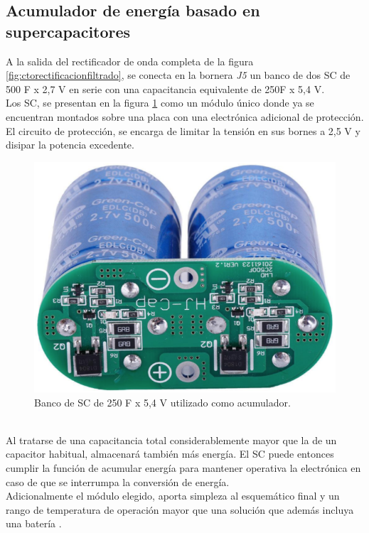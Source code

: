 \subsection{Acumulador de energía basado en supercapacitores}
A la salida del rectificador de onda completa de la figura \ref{fig:ctorectificacionfiltrado}, se conecta en la bornera \textit{J5} un banco de dos SC de 500 F x 2,7 V en serie con una capacitancia equivalente de 250F x 5,4 V.\\
Los SC, se presentan en la figura \ref{fig:imagensupercap} como un módulo único donde ya se encuentran montados sobre una placa con una electrónica adicional de protección. El circuito de protección, se encarga de limitar la tensión en sus bornes a 2,5 V y disipar la potencia excedente.\\
\begin{figure}[h]
	\centering
	\includegraphics[width=0.7\linewidth]{Figures/imagen_supercap}
	\caption{Banco de SC de 250 F x 5,4 V utilizado como acumulador.}
	\label{fig:imagensupercap}
\end{figure}\\
Al tratarse de una capacitancia total considerablemente mayor que la de un capacitor habitual, almacenará también más energía. El SC puede entonces cumplir la función de acumular energía para mantener operativa la electrónica en caso de que se interrumpa la conversión de energía.\\
Adicionalmente el módulo elegido, aporta simpleza al esquemático final y un rango de temperatura de operación mayor que una solución que además incluya una batería \citep{PORCARELLI20141671}.\\

